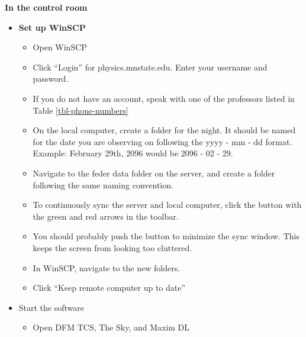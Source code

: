 \documentclass[letterpaper, 12pt]{report}
\begin{document}
{\large\textbf{In the control room}}
\begin{itemize}
	\item \textbf{Set up WinSCP}
	\begin{itemize}
		\item Open WinSCP
		\item Click ``Login'' for physics.mnstate.edu. Enter your username and password.
		\item If you do not have an account, speak with one of the professors listed in Table \ref{tbl-phone-numbers}
		\item On the local computer, create a folder for the night. It should be named for the date you are observing on following the yyyy - mm - dd format. Example: February 29th, 2096 would be 2096 - 02 - 29.
		\item Navigate to the feder data folder on the server, and create a folder following the same naming convention.
		\item To continuously sync the server and local computer, click the button with the green and red arrows in the toolbar.
		\item You should probably push the button to minimize the sync window. This keeps the screen from looking too cluttered.
		\item In WinSCP, navigate to the new folders.
		\item Click ``Keep remote computer up to date''
	\end{itemize}
	\item Start the software
	\begin{itemize}
		\item Open DFM TCS, The Sky, and Maxim DL
	\end{itemize}

\end{itemize}
\end{document}
